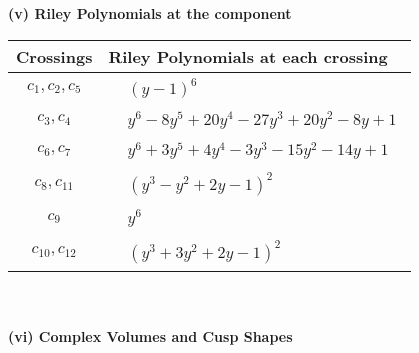\documentclass[1p]{elsarticle_modified}
\theoremstyle{definition}
\begin{document}
\newpage\renewcommand{\arraystretch}{1}
\flushleft \textbf{(v) Riley Polynomials at the component}\newline \\
\begin{tabular}{m{50pt}|m{274pt}}
Crossings & \hspace{64pt}Riley Polynomials at each crossing \\
\hline $$\begin{aligned}c_{1},c_{2},c_{5}\end{aligned}$$&$\begin{aligned}
&(y-1)^6
\end{aligned}$\\
\hline $$\begin{aligned}c_{3},c_{4}\end{aligned}$$&$\begin{aligned}
&y^6-8 y^5+20 y^4-27 y^3+20 y^2-8 y+1
\end{aligned}$\\
\hline $$\begin{aligned}c_{6},c_{7}\end{aligned}$$&$\begin{aligned}
&y^6+3 y^5+4 y^4-3 y^3-15 y^2-14 y+1
\end{aligned}$\\
\hline $$\begin{aligned}c_{8},c_{11}\end{aligned}$$&$\begin{aligned}
&(y^3- y^2+2 y-1)^2
\end{aligned}$\\
\hline $$\begin{aligned}c_{9}\end{aligned}$$&$\begin{aligned}
&y^6
\end{aligned}$\\
\hline $$\begin{aligned}c_{10},c_{12}\end{aligned}$$&$\begin{aligned}
&(y^3+3 y^2+2 y-1)^2
\end{aligned}$\\
\hline
\end{tabular}\\~\\
\newpage\flushleft \textbf{(vi) Complex Volumes and Cusp Shapes}
\end{document}
